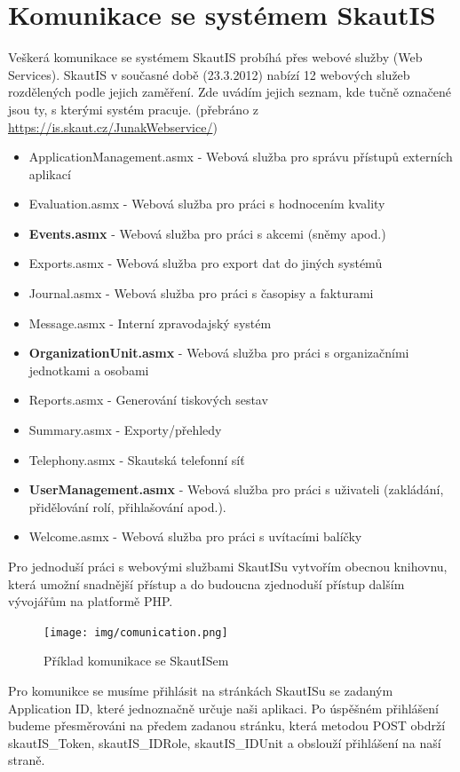 \documentclass[thesis=B,czech]{FITthesis}[2011/06/14]
\begin{document}
\section{Komunikace se systémem SkautIS}
Veškerá komunikace se systémem SkautIS probíhá přes webové služby (Web Services). SkautIS v současné době (23.3.2012) nabízí 12 webových služeb rozdělených podle jejich zaměření. Zde uvádím jejich seznam, kde tučně označené jsou ty, s kterými systém pracuje. (přebráno z \url{https://is.skaut.cz/JunakWebservice/})
\begin{itemize}
	\item ApplicationManagement.asmx - Webová služba pro správu přístupů externích aplikací
	\item Evaluation.asmx - Webová služba pro práci s hodnocením kvality
	\item \textbf{Events.asmx} - Webová služba pro práci s akcemi (sněmy apod.)
	\item Exports.asmx - Webová služba pro export dat do jiných systémů
	\item Journal.asmx - Webová služba pro práci s časopisy a fakturami
	\item Message.asmx - Interní zpravodajský systém
	\item \textbf{OrganizationUnit.asmx} - Webová služba pro práci s organizačními jednotkami a osobami
	\item Reports.asmx - Generování tiskových sestav
	\item Summary.asmx - Exporty/přehledy
	\item Telephony.asmx - Skautská telefonní síť
	\item \textbf{UserManagement.asmx} - Webová služba pro práci s uživateli (zakládání, přidělování rolí, přihlašování apod.).
	\item Welcome.asmx - Webová služba pro práci s uvítacími balíčky
\end{itemize}

Pro jednoduší práci s webovými službami SkautISu vytvořím obecnou knihovnu, která umožní snadnější přístup a do budoucna zjednoduší přístup dalším vývojářům na platformě PHP.

\begin{figure}[h] \centering
 	\texttt{[image: img/comunication.png]}
 	\caption[SkautIS]{Příklad komunikace se SkautISem}\label{fig:comunication-diagram}
\end{figure}

Pro komunikce se musíme přihlásit na stránkách SkautISu se zadaným Application ID, které jednoznačně určuje naši aplikaci. Po úspěšném přihlášení budeme přesměrováni na předem zadanou stránku, která metodou POST obdrží skautIS\_Token, skautIS\_IDRole, skautIS\_IDUnit a obslouží přihlášení na naší straně.   
\end{document}
